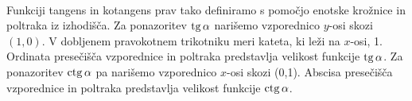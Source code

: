 \

Funkciji tangens in kotangens prav tako definiramo s pomočjo enotske krožnice in poltraka iz izhodišča. Za ponazoritev $\operatorname{tg}\alpha$ narišemo vzporednico $y$-osi skozi $(1,0)$. V dobljenem pravokotnem trikotniku meri kateta, ki leži na $x$-osi, 1. Ordinata presečišča vzporednice in poltraka predstavlja velikost funkcije $\operatorname{tg}\alpha$. Za ponazoritev $\operatorname{ctg}\alpha$ pa narišemo vzporednico $x$-osi skozi (0,1). Abscisa presečišča vzporednice in poltraka predstavlja velikost funkcije $\operatorname{ctg}\alpha$. 

